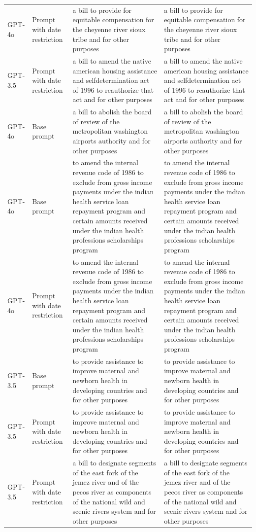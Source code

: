 \begin{longtable}{>{\raggedright\arraybackslash}p{1.4cm}>{\raggedright\arraybackslash}p{1.4cm}>{\raggedright\arraybackslash}p{5.5cm}>{\raggedright\arraybackslash}p{5.5cm}}
GPT-4o & Prompt with date restriction & a bill to provide for equitable compensation for the cheyenne river sioux tribe and for other purposes & a bill to provide for equitable compensation for the cheyenne river sioux tribe and for other purposes\\
GPT-3.5 & Prompt with date restriction & a bill to amend the native american housing assistance and selfdetermination act of 1996 to reauthorize that act and for other purposes & a bill to amend the native american housing assistance and selfdetermination act of 1996 to reauthorize that act and for other purposes\\
GPT-4o & Base prompt & a bill to abolish the board of review of the metropolitan washington airports authority and for other purposes & a bill to abolish the board of review of the metropolitan washington airports authority and for other purposes\\
GPT-4o & Base prompt & to amend the internal revenue code of 1986 to exclude from gross income payments under the indian health service loan repayment program and certain amounts received under the indian health professions scholarships program & to amend the internal revenue code of 1986 to exclude from gross income payments under the indian health service loan repayment program and certain amounts received under the indian health professions scholarships program\\
GPT-4o & Prompt with date restriction & to amend the internal revenue code of 1986 to exclude from gross income payments under the indian health service loan repayment program and certain amounts received under the indian health professions scholarships program & to amend the internal revenue code of 1986 to exclude from gross income payments under the indian health service loan repayment program and certain amounts received under the indian health professions scholarships program\\
GPT-3.5 & Base prompt & to provide assistance to improve maternal and newborn health in developing countries and for other purposes & to provide assistance to improve maternal and newborn health in developing countries and for other purposes\\
GPT-3.5 & Prompt with date restriction & to provide assistance to improve maternal and newborn health in developing countries and for other purposes & to provide assistance to improve maternal and newborn health in developing countries and for other purposes\\
GPT-3.5 & Prompt with date restriction & a bill to designate segments of the east fork of the jemez river and of the pecos river as components of the national wild and scenic rivers system and for other purposes & a bill to designate segments of the east fork of the jemez river and of the pecos river as components of the national wild and scenic rivers system and for other purposes\\

\end{longtable}
